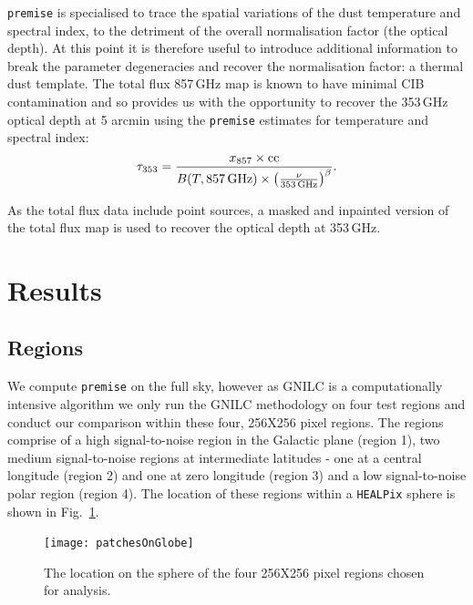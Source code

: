 \documentclass[a4paper,fleqn,usenatbib]{mnras}
\begin{document}
{\texttt{premise}} is specialised to trace the spatial variations of the dust temperature and spectral index, to the detriment of the overall normalisation factor (the optical depth). At this point it is therefore useful to introduce additional information to break the parameter degeneracies and recover the normalisation factor: a thermal dust template. The total flux 857\,GHz map is known to have minimal CIB contamination and so provides us with the opportunity to recover the 353\,GHz optical depth at 5 arcmin using the {\texttt{premise}} estimates for temperature and spectral index: 
\begin{eqnarray}
\tau_{353} = \frac{x_{857} \times \rm{cc}}{B(T,  857\,\rm{GHz}) \times \left(\frac{\nu}{353 \, \rm{GHz}}\right)^{\beta} }.
\end{eqnarray}

As the total flux data include point sources, a masked and inpainted \citep{inpaint} version of the total flux map is used to recover the optical depth at 353\,GHz. 

\section{Results}
\label{sec:results}

\subsection{Regions}

We compute {\texttt{premise}} on the full sky, however as GNILC is a computationally intensive algorithm we only run the GNILC methodology on four test regions and conduct our comparison within these four, 256X256 pixel regions. The regions comprise of a high signal-to-noise region in the Galactic plane (region 1), two medium signal-to-noise regions at intermediate latitudes - one at a central longitude (region 2) and one at zero longitude (region 3) and a low signal-to-noise polar region (region 4). The location of these regions within a {\texttt{HEALPix}} sphere is shown in Fig.~\ref{fig:globe}. 

\begin{figure}
	\centering
	\texttt{[image: patchesOnGlobe]}
	\caption{The location on the sphere of the four 256X256 pixel regions chosen for analysis.}
	\label{fig:globe}
\end{figure}
\end{document}
